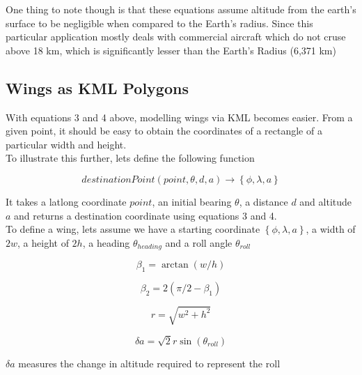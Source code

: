 One thing to note though is that these equations assume altitude from the earth's surface to be negligible when compared to the Earth's radius. Since this particular application mostly deals with commercial aircraft which do not cruse above 18 km, which is significantly lesser than the Earth's Radius (6,371 km)


\subsection{Wings as KML Polygons}

With equations 3 and 4 above, modelling wings via KML becomes easier. From a given point, it should be easy to obtain the coordinates of a rectangle of a particular width and height. \\

To illustrate this further, lets define the following function

\begin{equation}
destinationPoint(point, \theta, d, a) \to \left\{ \phi, \lambda, a \right\}
\end{equation}

 It takes a latlong coordinate $point$, an initial bearing $\theta$, a distance $d$ and altitude $a$ and returns a destination coordinate using equations 3 and 4. \\

To define a wing, lets assume we have a starting coordinate $\left\{\phi, \lambda, a \right\}$, a width of $2w$, a height of $2h$, a heading $\theta_{heading}$ and a roll angle $\theta_{roll}$

\begin{equation}
 \beta_{1} = \arctan(w/h)
\end{equation}

\begin{equation}
 \beta_{2} = 2( \pi/2 - \beta_{1})
\end{equation}

\begin{equation}
 r = \sqrt{w^2 + h^2}
\end{equation}

\begin{equation}
\delta a = \sqrt{2} r \sin(\theta_{roll})
\end{equation}

$\delta a$ measures the change in altitude required to represent the roll \\

